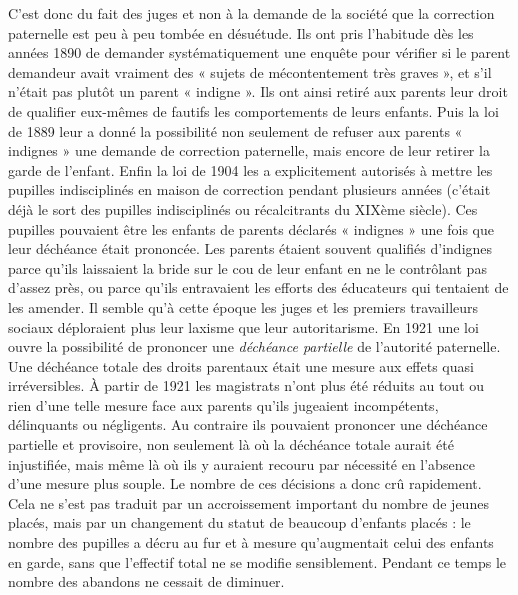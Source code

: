  C'est donc du fait des juges et non à la demande de la société que la correction paternelle est peu à peu tombée en désuétude. Ils ont pris l'habitude dès les années 1890 de demander systématiquement une enquête pour vérifier si le parent demandeur avait vraiment des « sujets de mécontentement très graves », et s'il n'était pas plutôt un parent « indigne ». Ils ont ainsi retiré aux parents leur droit de qualifier eux-mêmes de fautifs les comportements de leurs enfants. Puis la loi de 1889 leur a donné la possibilité non seulement de refuser aux parents « indignes » une demande de correction paternelle, mais encore de leur retirer la garde de l'enfant. Enfin la loi de 1904 les a explicitement autorisés à mettre les pupilles indisciplinés en maison de correction pendant plusieurs années (c'était déjà le sort des pupilles indisciplinés ou récalcitrants du XIXème siècle). Ces pupilles pouvaient être les enfants de parents déclarés « indignes » une fois que leur déchéance était prononcée. Les parents étaient souvent qualifiés d'indignes parce qu'ils laissaient la bride sur le cou de leur enfant en ne le contrôlant pas d'assez près, ou parce qu'ils entravaient les efforts des éducateurs qui tentaient de les amender. Il semble qu'à cette époque les juges et les premiers travailleurs sociaux déploraient plus leur laxisme que leur autoritarisme. 
 En 1921 une loi ouvre la possibilité de prononcer une \emph{déchéance partielle} de l'autorité paternelle. Une déchéance totale des droits parentaux était une mesure aux effets quasi irréversibles. À partir de 1921 les magistrats n'ont plus été réduits au tout ou rien d'une telle mesure face aux parents qu'ils jugeaient incompétents, délinquants ou négligents. Au contraire ils pouvaient prononcer une déchéance partielle et provisoire, non seulement là où la déchéance totale aurait été injustifiée, mais même là où ils y auraient recouru par nécessité en l'absence d'une mesure plus souple. Le nombre de ces décisions a donc crû rapidement. Cela ne s'est pas traduit par un accroissement important du nombre de jeunes placés, mais par un changement du statut de beaucoup d'enfants placés : le nombre des pupilles a décru au fur et à mesure qu'augmentait celui des enfants en garde, sans que l'effectif total ne se modifie sensiblement. Pendant ce temps le nombre des abandons ne cessait de diminuer.
